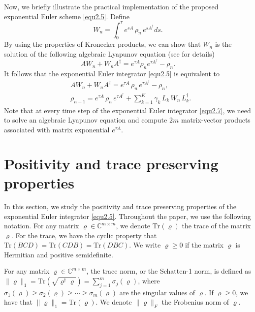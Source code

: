 \documentclass[preprint,3p,compress,12pt]{elsarticle}
\numberwithin{equation}{section}
\numberwithin{figure}{section}
\begin{document}
Now, we briefly illustrate the practical implementation of the proposed exponential Euler scheme \eqref{equ2.5}. Define
\begin{equation*}
  W_n=\int_0^{\tau}e^{sA} \, \rho_n  \, e^{sA^{\dag}}ds.
\end{equation*}
By using the properties of Kronecker products, we can show that $W_n$ is the solution of the following algebraic Lyapunov equation (see \cite{Chen1,Chen2} for details)
\begin{equation*}
  AW_n+W_nA^{\dag}=e^{\tau A}\rho_ne^{\tau A^{\dag}}-\rho_n.
\end{equation*}
It follows that the exponential Euler integrator \eqref{equ2.5} is equivalent to
\begin{subequations}\label{equ2.7}
  \begin{align}
  &AW_n+W_nA^{\dag}=e^{\tau A} \, \rho_n \, e^{\tau A^{\dag}}-\rho_n,\label{equ2.7a}\\
  &\rho_{n+1}=e^{\tau A} \, \rho_n  \, e^{\tau A^{\dag}}+\sum_{k=1}^K\gamma_k \, L_k \, W_n \, L_k^{\dag}.\label{equ2.7b}
\end{align}
\end{subequations}
Note that at every time step of the exponential Euler integrator \eqref{equ2.7}, we need to solve an algebraic Lyapunov equation and compute $2m$ matrix-vector products associated with matrix exponential $e^{\tau A}$.

\section{Positivity and trace preserving properties}
In this section, we study the positivity and trace preserving properties of the exponential Euler integrator \eqref{equ2.5}. Throughout the paper, we use the following notation.
For any matrix $\varrho\in \mathbb{C}^{m\times m}$, we denote $\mbox{Tr}(\varrho)$ the trace of the matrix $\varrho$. For the trace, we have the cyclic property that $\mbox{Tr}(BCD)=\mbox{Tr}(CDB)=\mbox{Tr}(DBC)$. We write $\varrho\geq0$ if the matrix $\varrho$ is Hermitian and positive semidefinite.

For any matrix $\varrho\in \mathbb{C}^{m\times m}$, the trace norm, or the Schatten-1 norm, is defined as $\|\varrho\|_1=\mbox{Tr}(\sqrt{\varrho^{\dag}\varrho})=\sum_{j=1}^m\sigma_j(\varrho)$, where $\sigma_1(\varrho)\geq\sigma_2(\varrho)\geq\cdots\geq\sigma_m(\varrho)$ are the singular values of $\varrho$. If $\varrho\geq0$, we have that $\|\varrho\|_1=\mbox{Tr}(\varrho)$. We denote $\|\varrho\|_F$ the Frobenius norm of $\varrho$.
\end{document}
